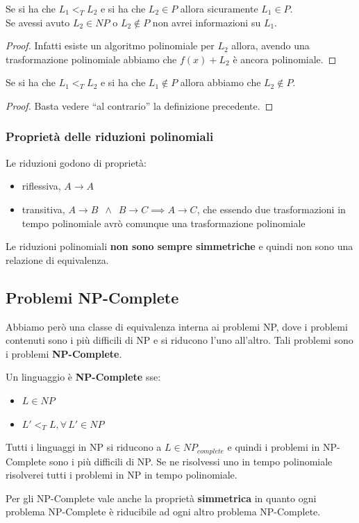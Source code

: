 \begin{definizione}
  Se si ha che $L_1<_T L_2$ e si ha che $L_2\in P$ allora sicuramente $L_1\in
  P$.\\
  Se avessi avuto $L_2\in NP$ o $L_2\not\in P$ non avrei informazioni su $L_1$. 

\end{definizione}
\begin{proof}
  Infatti esiste un algoritmo polinomiale per $L_2$ allora, avendo una
  trasformazione polinomiale  abbiamo che $f(x)+L_2$ è ancora polinomiale.
\end{proof}
\begin{definizione}
  Se si ha che $L_1<_T L_2$ e si ha che $L_1\not\in P$ allora abbiamo che
  $L_2\not\in P$.
\end{definizione}
\begin{proof}
  Basta vedere ``al contrario'' la definizione precedente.
\end{proof}
\subsubsection{Proprietà delle riduzioni polinomiali}
Le riduzioni godono di proprietà:
\begin{itemize}
  \item riflessiva, $A\to A$
  \item transitiva, $A\to B\,\,\,\land \,\,\,B\to C\implies A\to C$, che essendo
  due trasformazioni in tempo polinomiale avrò comunque una trasformazione
  polinomiale 
\end{itemize}
Le riduzioni polinomiali \textbf{non sono sempre simmetriche} e quindi non sono
una relazione di equivalenza.\\
\subsection{Problemi NP-Complete}
Abbiamo però una classe di equivalenza interna ai problemi NP, dove i problemi
contenuti sono i più difficili di NP e si riducono l'uno all'altro. Tali
problemi sono i problemi \textbf{NP-Complete}.
\begin{definizione}
  Un linguaggio è \textbf{NP-Complete} sse:
  \begin{itemize}
    \item $L\in NP$
    \item $L'<_TL,\forall\,L'\in NP$
  \end{itemize}
  Tutti i linguaggi in NP si riducono a $L\in NP_{complete}$ e quindi i problemi in NP-Complete sono i più difficili di NP.
  Se ne risolvessi uno in tempo polinomiale risolverei tutti i problemi in NP in
  tempo polinomiale.
\end{definizione}
\begin{definizione}
  Per gli NP-Complete vale anche la proprietà \textbf{simmetrica} in quanto ogni problema NP-Complete è riducibile ad ogni altro problema NP-Complete.
\end{definizione}
